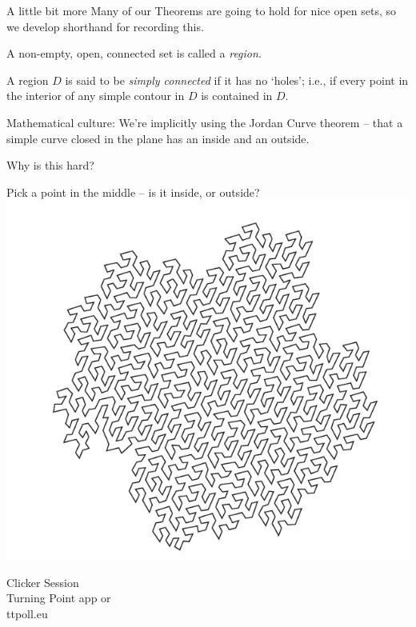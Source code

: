\documentclass{beamer}
\begin{document}
\begin{frame}{A little bit more}
Many of our Theorems are going to hold for nice open sets, so we develop shorthand for recording this.
\begin{definition}[4.4 in notes]
A non-empty, open, connected set is called a \emph{region}.
\end{definition}
\begin{definition}[4.5 in notes]
A region $D$ is said to be \emph{simply connected} if it has no `holes'; i.e., if every point in the interior of any simple contour in $D$ is contained in $D$.
\end{definition}
\begin{block}{Mathematical culture:}
We're implicitly using the Jordan Curve theorem -- that a simple curve closed in the plane has an inside and an outside.  
\end{block}
\begin{block}{Why is this hard?}
\end{block}
\end{frame}

\begin{frame}{Pick a point in the middle -- is it inside, or outside?}
\includegraphics[width=\textwidth,height=0.8\textheight,keepaspectratio]{JordanCurveHard.png}

\end{frame}

\begin{frame}
  
\begin{center}

\Huge

Clicker Session \\
Turning Point app or \\
ttpoll.eu 

\end{center}

\end{frame}
\end{document}
